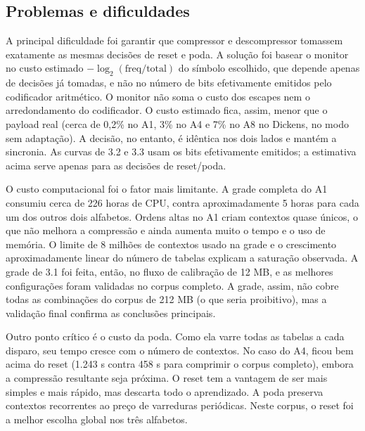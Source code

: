 \documentclass[12pt,a4paper]{article}
\begin{document}
\subsection{Problemas e dificuldades}
A principal dificuldade foi garantir que compressor e descompressor tomassem
exatamente as mesmas decis\~oes de reset e poda. A solu\c{c}\~ao foi basear o monitor
no custo estimado $-\log_2(\mathrm{freq}/\mathrm{total})$ do s\'imbolo escolhido,
que depende apenas de decis\~oes j\'a tomadas, e n\~ao no n\'umero de bits
efetivamente emitidos pelo codificador aritm\'etico. O monitor n\~ao soma o custo
dos escapes nem o arredondamento do codificador. O custo estimado fica, assim,
menor que o payload real (cerca de 0,2\% no A1, 3\% no A4 e 7\% no A8 no Dickens,
no modo sem adapta\c{c}\~ao). A decis\~ao, no entanto, \'e id\^entica nos dois lados
e mant\'em a sincronia. As curvas de 3.2 e 3.3 usam os bits efetivamente emitidos;
a estimativa acima serve apenas para as decis\~oes de reset/poda.

O custo computacional foi o fator mais limitante. A grade completa do A1 consumiu
cerca de 226 horas de CPU, contra aproximadamente 5 horas para cada um dos outros
dois alfabetos. Ordens altas no A1 criam contextos quase \'unicos, o que n\~ao
melhora a compress\~ao e ainda aumenta muito o tempo e o uso de mem\'oria. O limite
de 8 milh\~oes de contextos usado na grade e o crescimento aproximadamente linear
do n\'umero de tabelas explicam a satura\c{c}\~ao observada. A grade de
3.1 foi feita, ent\~ao, no fluxo de calibra\c{c}\~ao de 12 MB, e as melhores
configura\c{c}\~oes foram validadas no corpus completo. A grade, assim, n\~ao cobre
todas as combina\c{c}\~oes do corpus de 212 MB (o que seria proibitivo), mas
a valida\c{c}\~ao final confirma as conclus\~oes principais.

Outro ponto cr\'itico \'e o custo da poda. Como ela varre todas as tabelas a cada
disparo, seu tempo cresce com o n\'umero de contextos. No caso do A4, ficou bem acima do
reset (1.243 s contra 458 s para comprimir o corpus completo), embora a
compress\~ao resultante seja pr\'oxima. O reset tem a vantagem de ser mais simples e mais r\'apido,
mas descarta todo o aprendizado. A poda preserva contextos recorrentes ao
pre\c{c}o de varreduras peri\'odicas. Neste corpus, o reset foi a melhor escolha
global nos tr\^es alfabetos.
\end{document}
